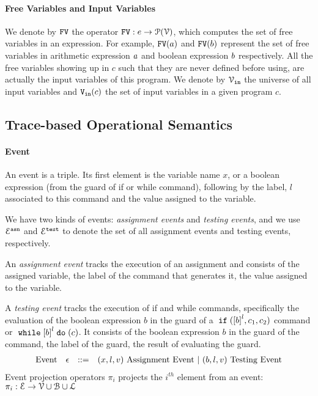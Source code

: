 \paragraph{Free Variables and Input Variables}
  We denote by $\mathtt{FV}$ the operator $\mathtt{FV}: e \to \mathcal{P}(\mathcal{V})$, which computes the set of free variables in an expression. For example,
  $\mathtt{FV}(a)$ and $\mathtt{FV}(b)$ represent the set of free variables in arithmetic
  expression $a$ and boolean expression $b$ respectively.
  All the free variables
  showing up in $c$ such that they are never defined before using, are actually the input variables of this program.
  We denote by $\mathcal{V}_{\mathtt{in}}$ the universe of all input variables and $\mathtt{V_{\mathtt{in}}}(c)$ the set of input variables in a given program $c$.

\subsection{{Trace-based Operational Semantics}}
\label{sec:operational_semantics}
\paragraph{Event}
An event is a triple.
Its first element is the variable name $x$,
or a boolean expression (from the guard of if or while command), 
following by 
 the label, $l$ associated to this command and the value assigned to the variable.

 We have two kinds of events: \emph{assignment events} and \emph{testing events},
 and we use $\mathcal{E}^{\mathtt{{asn}}}$ and $\mathcal{E}^{\mathtt{{test}}}$ to denote the set of all assignment events and testing events, respectively.

 An \emph{assignment event} tracks the execution of an assignment and consists of the assigned variable, the label of the command that generates it, the value assigned to the variable.

 A \emph{testing event} tracks the execution of if and while commands, specifically the evaluation of the boolean expression $b$ in the guard of a $\eif(\clabel{b}^l, c_1, c_2)$ command or $\ewhile \clabel{b}^l \edo (c)$.
 It consists of the boolean expression $b$ in the guard of the command, the label of the guard, the result of evaluating the guard.
%
\[
\begin{array}{llll}
  \mbox{Event} 
  & \mathtt{\epsilon} & ::= & 
  ({x}, l, v) ~ \mbox{Assignment Event} 
  ~|~(b, l, v) ~ \mbox{Testing Event}
\end{array}
\]
Event projection operators $\pi_i$ projects the $i^{th}$ element from an event: 
$\pi_i : \mathcal{E} \to \mathcal{V} \cup \mathcal{B} \cup \mathcal{L} $

